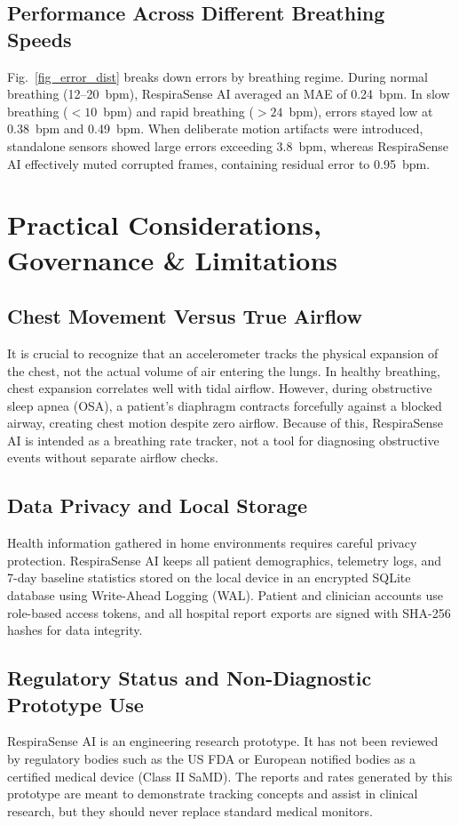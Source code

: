 \documentclass[journal]{IEEEtran}
\begin{document}
\subsection{Performance Across Different Breathing Speeds}
Fig.~\ref{fig_error_dist} breaks down errors by breathing regime. During normal breathing (12--20~bpm), RespiraSense AI averaged an MAE of 0.24~bpm. In slow breathing ($< 10$~bpm) and rapid breathing ($> 24$~bpm), errors stayed low at 0.38~bpm and 0.49~bpm. When deliberate motion artifacts were introduced, standalone sensors showed large errors exceeding 3.8~bpm, whereas RespiraSense AI effectively muted corrupted frames, containing residual error to 0.95~bpm.

\section{Practical Considerations, Governance \& Limitations}

\subsection{Chest Movement Versus True Airflow}
It is crucial to recognize that an accelerometer tracks the physical expansion of the chest, not the actual volume of air entering the lungs. In healthy breathing, chest expansion correlates well with tidal airflow. However, during obstructive sleep apnea (OSA), a patient's diaphragm contracts forcefully against a blocked airway, creating chest motion despite zero airflow. Because of this, RespiraSense AI is intended as a breathing rate tracker, not a tool for diagnosing obstructive events without separate airflow checks.

\subsection{Data Privacy and Local Storage}
Health information gathered in home environments requires careful privacy protection. RespiraSense AI keeps all patient demographics, telemetry logs, and 7-day baseline statistics stored on the local device in an encrypted SQLite database using Write-Ahead Logging (WAL). Patient and clinician accounts use role-based access tokens, and all hospital report exports are signed with SHA-256 hashes for data integrity.

\subsection{Regulatory Status and Non-Diagnostic Prototype Use}
RespiraSense AI is an engineering research prototype. It has not been reviewed by regulatory bodies such as the US FDA or European notified bodies as a certified medical device (Class II SaMD). The reports and rates generated by this prototype are meant to demonstrate tracking concepts and assist in clinical research, but they should never replace standard medical monitors.
\end{document}
